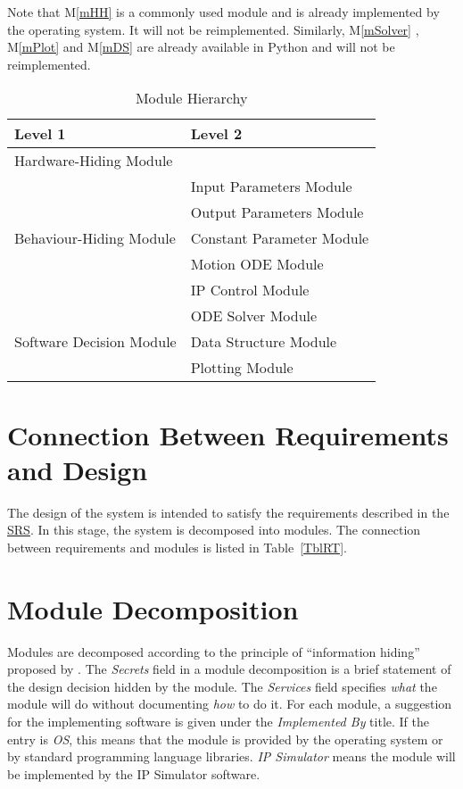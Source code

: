 \documentclass[12pt, titlepage]{article}
\newcommand{\mref}[1]{M\ref{#1}}
\begin{document}
Note that \mref{mHH} is a commonly used module and is already implemented by the operating system.  It will not be reimplemented.  Similarly, \mref{mSolver} , \mref{mPlot} and  \mref{mDS} are already available in Python and will not be reimplemented.



\begin{table}[h!]
\centering
\begin{tabular}{p{} p{}}
\toprule
\textbf{Level 1} & \textbf{Level 2}\\
\midrule

{Hardware-Hiding Module} & ~ \\
\midrule

\multirow{5}{0.3\textwidth}{Behaviour-Hiding Module} & Input Parameters Module\\
& Output Parameters Module\\
& Constant Parameter Module\\
&Motion ODE  Module\\
& IP Control Module\\
\midrule

\multirow{3}{0.3\textwidth}{Software Decision Module} & {ODE Solver Module}\\
& Data Structure Module\\
& Plotting Module\\
\bottomrule

\end{tabular}
\caption{Module Hierarchy}
\label{TblMH}
\end{table}

\section{Connection Between Requirements and Design} \label{SecConnection}

The design of the system is intended to satisfy the requirements described in the \href{https://github.com/MinMah23/CAS741-Project/tree/main/docs/SRS}{SRS}. In this stage, the system is decomposed into modules. The connection
between requirements and modules is listed in Table~\ref{TblRT}.


\section{Module Decomposition} \label{SecMD}

Modules are decomposed according to the principle of ``information hiding''
proposed by \citet{ParnasEtAl1984}. The \emph{Secrets} field in a module
decomposition is a brief statement of the design decision hidden by the
module. The \emph{Services} field specifies \emph{what} the module will do
without documenting \emph{how} to do it. For each module, a suggestion for the implementing software is given under the \emph{Implemented By} title. If the entry is \emph{OS}, this means that the module is provided by the operating system or by standard programming language libraries.  \emph{IP Simulator} means the module will be implemented by the IP Simulator software.
\end{document}
